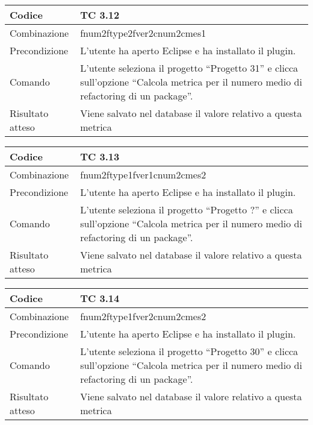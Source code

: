 \begin{table}[ht]
\begin{tabular}{|p{3cm}|p{9cm}|}
\hline
\cellcolor{lightgray}Codice				& TC 3.12								\\
\hline
\cellcolor{lightgray}Combinazione		& fnum2ftype2fver2cnum2cmes1 									\\
\hline
\cellcolor{lightgray}Precondizione		& L'utente ha aperto Eclipse e ha installato il plugin.				\\
\hline 
\cellcolor{lightgray}Comando 			& L'utente seleziona il progetto ``Progetto 31''  e clicca sull'opzione ``Calcola metrica per il numero medio di refactoring di un package''.	\\
\hline
\cellcolor{lightgray}Risultato atteso	& Viene salvato nel database il valore relativo a questa metrica	\\
\hline
\end{tabular}
\end{table}

\begin{table}[ht]
\begin{tabular}{|p{3cm}|p{9cm}|}
\hline
\cellcolor{lightgray}Codice				& TC 3.13								\\
\hline
\cellcolor{lightgray}Combinazione		& fnum2ftype1fver1cnum2cmes2 									\\
\hline
\cellcolor{lightgray}Precondizione		& L'utente ha aperto Eclipse e ha installato il plugin.					\\
\hline
\cellcolor{lightgray}Comando			& L'utente seleziona il progetto ``Progetto ?''  e clicca sull'opzione ``Calcola metrica per il numero medio di refactoring di un package''.	\\
\hline
\cellcolor{lightgray}Risultato atteso	& Viene salvato nel database il valore relativo a questa metrica	\\
\hline
\end{tabular}
\end{table}

\begin{table}[ht]
\begin{tabular}{|p{3cm}|p{9cm}|}
\hline
\cellcolor{lightgray}Codice				& TC 3.14								\\
\hline
\cellcolor{lightgray}Combinazione		& fnum2ftype1fver2cnum2cmes2									\\
\hline
\cellcolor{lightgray}Precondizione		& L'utente ha aperto Eclipse e ha installato il plugin.			\\
\hline
\cellcolor{lightgray}Comando			& L'utente seleziona il progetto ``Progetto 30''  e clicca sull'opzione ``Calcola metrica per il numero medio di refactoring di un package''.	\\
\hline
\cellcolor{lightgray}Risultato atteso	& Viene salvato nel database il valore relativo a questa metrica	\\
\hline
\end{tabular}
\end{table}

